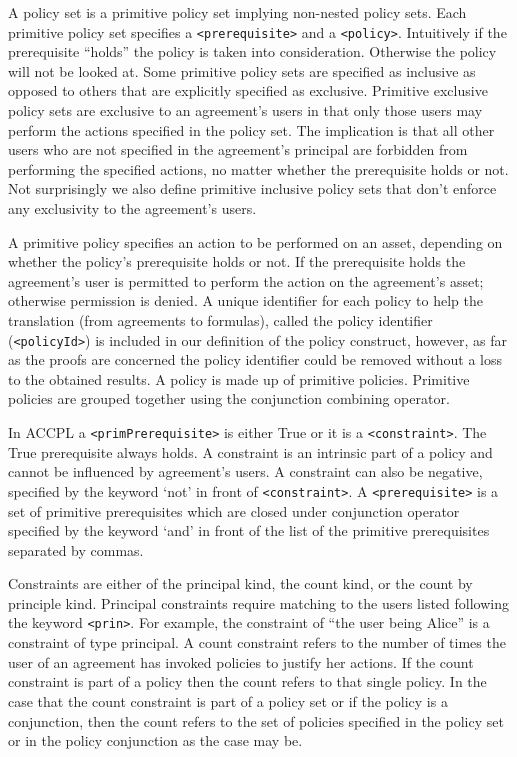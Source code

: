 \documentclass[runningheads,a4paper]{llncs}
\newcommand{\syn}{\texttt}
\begin{document}
A policy set is a primitive policy set implying non-nested policy sets. Each primitive policy set specifies a \syn{<prerequisite>} and a \syn{<policy>}. Intuitively if the prerequisite ``holds'' the policy is taken into consideration. Otherwise the policy will not be looked at. Some primitive policy sets are specified as inclusive as opposed to others that are explicitly specified as exclusive. Primitive exclusive policy sets are exclusive to an agreement's users in that only those users may perform the actions specified in the policy set. The implication is that all other users who are not specified in the agreement's principal are forbidden from performing the specified actions, no matter whether the prerequisite holds or not. Not surprisingly we also define primitive inclusive policy sets that don't enforce any exclusivity to the agreement's users.

A primitive policy specifies an action to be performed on an asset, depending on whether the policy's prerequisite holds or not. If the prerequisite holds the agreement's user is permitted to perform the action on the agreement's asset; otherwise permission is denied. A unique identifier for each policy to help the translation (from agreements to formulas), called the policy identifier (\syn{<policyId>}) is included in our definition of the policy construct, however, as far as the proofs are concerned the policy identifier could be removed without a loss to the obtained results. A policy is made up of primitive policies. Primitive policies are grouped together using the conjunction combining operator.

In \ac{ACCPL} a \syn{<primPrerequisite>} is either True or it is a \syn{<constraint>}. The True prerequisite always holds. A constraint is an intrinsic part of a policy and cannot be influenced by agreement's users. A constraint can also be negative, specified by the keyword `not' in front of \syn{<constraint>}. A \syn{<prerequisite>} is a set of primitive prerequisites which are closed under conjunction operator specified by the keyword `and' in front of the list of the primitive prerequisites separated by commas.

Constraints are either of the principal kind, the count kind, or the count by principle kind. Principal constraints require matching to the users listed following the keyword \syn{<prin>}. For example, the constraint of ``the user being Alice'' is a constraint of type principal. A count constraint refers to the number of times the user of an agreement has invoked policies to justify her actions. If the count constraint is part of a policy then the count refers to that single policy. In the case that the count constraint is part of a policy set or if the policy is a conjunction, then the count refers to the set of policies specified in the policy set or in the policy conjunction as the case may be.
\end{document}
